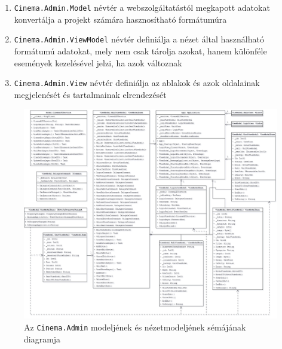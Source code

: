 \documentclass{article}
\begin{document}
\begin{itemize}
\begin{enumerate}
			\begin{enumerate}
				\item \texttt{Cinema.Admin.Model} névtér a webszolgáltatástól megkapott adatokat konvertálja a projekt számára hasznosítható formátumúra
				\item \texttt{Cinema.Admin.ViewModel} névtér definiálja a nézet által használható formátumú adatokat, mely nem csak tárolja azokat, hanem különféle események kezelésével jelzi, ha azok változnak
				\item \texttt{Cinema.Admin.View} névtér definiálja az ablakok és azok oldalainak megjelenését és tartalmainak elrendezését
			\end{enumerate}
				\begin{figure}[H]
				\centering
				\includegraphics[width=\textwidth]{admin}
				\caption{Az \texttt{Cinema.Admin} modeljének és nézetmodeljének sémájának diagramja}
			\end{figure}
		\end{enumerate}
	\end{itemize}
\end{document}
